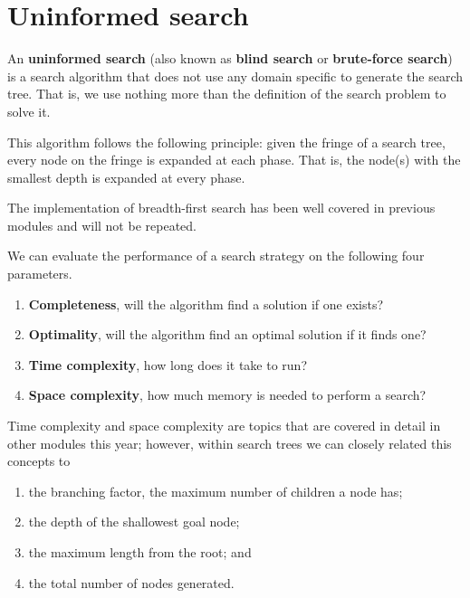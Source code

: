 \chapter{Uninformed search}


\begin{definition}
    An \textbf{uninformed search} (also known as \textbf{blind search} or \textbf{brute-force search}) is a search algorithm that does not use any domain specific to generate the search tree. That is, we use nothing more than the definition of the search problem to solve it.
\end{definition}

\begin{example}
    This algorithm follows the following principle: given the fringe of a search tree, every node on the fringe is expanded at each phase. That is, the node(s) with the smallest depth is expanded at every phase.
\end{example}

The implementation of breadth-first search has been well covered in previous modules and will not be repeated.

We can evaluate the performance of a search strategy on the following four parameters.
\begin{enumerate}
    \item \textbf{Completeness}, will the algorithm find a solution if one exists?
    \item \textbf{Optimality}, will the algorithm find an optimal solution if it finds one?
    \item \textbf{Time complexity}, how long does it take to run?
    \item \textbf{Space complexity}, how much memory is needed to perform a search?
\end{enumerate}

Time complexity and space complexity are topics that are covered in detail in other modules this year; however, within search trees we can closely related this concepts to 
\begin{enumerate}
    \item the branching factor, the maximum number of children a node has;
    \item the depth of the shallowest goal node;
    \item the maximum length from the root; and
    \item the total number of nodes generated.
\end{enumerate}

